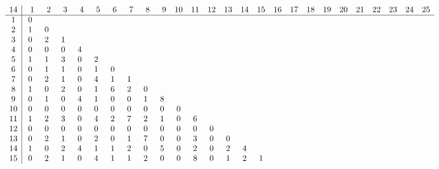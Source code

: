 \begin{landscape}
\[
\begin{array}{c|ccccccccccccccccccccccccc}\addcontentsline{lot}{table}{\protect\numberline{}Dimensions of the Kernel of $\mathcal{L}_{r,c,14}$}
14&  \phantom{0}1&  \phantom{0}2&  \phantom{0}3&  \phantom{0}4&  \phantom{0}5&  \phantom{0}6&  \phantom{0}7&  \phantom{0}8&  \phantom{0}9& 10& 11& 12& 13& 14& 15& 16& 17& 18& 19& 20& 21& 22& 23& 24& 25\\
\hline
 1&  0&   &   &   &   &   &   &   &   &   &   &   &   &   &   &   &   &   &   &   &   &   &   &   &   \\
 2&  1&  0&   &   &   &   &   &   &   &   &   &   &   &   &   &   &   &   &   &   &   &   &   &   &   \\
 3&  0&  2&  1&   &   &   &   &   &   &   &   &   &   &   &   &   &   &   &   &   &   &   &   &   &   \\
 4&  0&  0&  0&  4&   &   &   &   &   &   &   &   &   &   &   &   &   &   &   &   &   &   &   &   &   \\
 5&  1&  1&  3&  0&  2&   &   &   &   &   &   &   &   &   &   &   &   &   &   &   &   &   &   &   &   \\
 6&  0&  1&  1&  0&  1&  0&   &   &   &   &   &   &   &   &   &   &   &   &   &   &   &   &   &   &   \\
 7&  0&  2&  1&  0&  4&  1&  1&   &   &   &   &   &   &   &   &   &   &   &   &   &   &   &   &   &   \\
 8&  1&  0&  2&  0&  1&  6&  2&  0&   &   &   &   &   &   &   &   &   &   &   &   &   &   &   &   &   \\
 9&  0&  1&  0&  4&  1&  0&  0&  1&  8&   &   &   &   &   &   &   &   &   &   &   &   &   &   &   &   \\
10&  0&  0&  0&  0&  0&  0&  0&  0&  0&  0&   &   &   &   &   &   &   &   &   &   &   &   &   &   &   \\
11&  1&  2&  3&  0&  4&  2&  7&  2&  1&  0&  6&   &   &   &   &   &   &   &   &   &   &   &   &   &   \\
12&  0&  0&  0&  0&  0&  0&  0&  0&  0&  0&  0&  0&   &   &   &   &   &   &   &   &   &   &   &   &   \\
13&  0&  2&  1&  0&  2&  0&  1&  7&  0&  0&  3&  0&  0&   &   &   &   &   &   &   &   &   &   &   &   \\
14&  1&  0&  2&  4&  1&  1&  2&  0&  5&  0&  2&  0&  2&  4&   &   &   &   &   &   &   &   &   &   &   \\
15&  0&  2&  1&  0&  4&  1&  1&  2&  0&  0&  8&  0&  1&  2&  1&   &   &   &   &   &   &   &   &   &   \\

\end{array}\]
\end{landscape}
